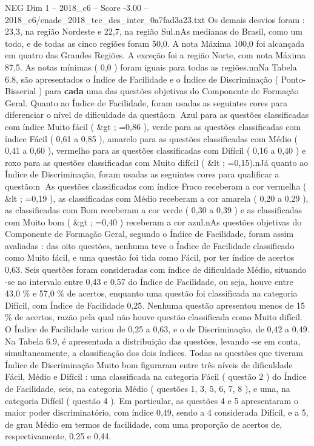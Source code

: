 \begin{textsample}{NEG Dim 1 – 2018\_c6 – Score -3.00 – 2018\_c6/enade\_2018\_tec\_des\_inter\_0a7fad3a23.txt}
Os demais desvios foram : 23,3, na região Nordeste e 22,7, na região Sul.nAs medianas do Brasil, como um todo, e de todas as cinco regiões foram 50,0.
A nota Máxima 100,0 foi alcançada em quatro das Grandes Regiões.
A exceção foi a região Norte, com nota Máxima 87,5.
As notas mínimas ( 0,0 ) foram iguais para todas as regiões.nnNa Tabela 6.8, são apresentados o Índice de Facilidade e o Índice de Discriminação ( Ponto-Bisserial ) para \textbf{cada} uma das questões objetivas do Componente de Formação Geral.
Quanto ao Índice de Facilidade, foram usadas as seguintes cores para diferenciar o nível de dificuldade da questão:n Azul para as questões classificadas com índice Muito fácil ( \&gt ; =0,86 ), verde para as questões classificadas com índice Fácil ( 0,61 a 0,85 ), amarelo para as questões classificadas com Médio ( 0,41 a 0,60 ), vermelho para as questões classificadas com Difícil ( 0,16 a 0,40 ) e roxo para as questões classificadas com Muito difícil ( \&lt ; =0,15).nJá quanto ao Índice de Discriminação, foram usadas as seguintes cores para qualificar a questão:n As questões classificadas com índice Fraco receberam a cor vermelha ( \&lt ; =0,19 ), as classificadas com Médio receberam a cor amarela ( 0,20 a 0,29 ), as classificadas com Bom receberam a cor verde ( 0,30 a 0,39 ) e as classificadas com Muito bom ( \&gt ; =0,40 ) receberam a cor azul.nAs questões objetivas do Componente de Formação Geral, segundo o Índice de Facilidade, foram assim avaliadas : das oito questões, nenhuma teve o Índice de Facilidade classificado como Muito fácil, e uma questão foi tida como Fácil, por ter índice de acertos 0,63.
Seis questões foram consideradas com índice de dificuldade Médio, situando -se no intervalo entre 0,43 e 0,57 do Índice de Facilidade, ou seja, houve entre 43,0 \% e 57,0 \% de acertos, enquanto uma questão foi classificada na categoria Difícil, com Índice de Facilidade 0,25.
Nenhuma questão apresentou menos de 15 \% de acertos, razão pela qual não houve questão classificada como Muito difícil.
O Índice de Facilidade variou de 0,25 a 0,63, e o de Discriminação, de 0,42 a 0,49.
Na Tabela 6.9, é apresentada a distribuição das questões, levando -se em conta, simultaneamente, a classificação dos dois índices.
Todas as questões que tiveram Índice de Discriminação Muito bom figuraram entre três níveis de dificuldade Fácil, Médio e Difícil : uma classificada na categoria Fácil ( questão 2 ) do Índice de Facilidade, seis, na categoria Médio ( questões 1, 3, 5, 6, 7, 8 ), e uma, na categoria Difícil ( questão 4 ).
Em particular, as questões 4 e 5 apresentaram o maior poder discriminatório, com índice 0,49, sendo a 4 considerada Difícil, e a 5, de grau Médio em termos de facilidade, com uma proporção de acertos de, respectivamente, 0,25 e 0,44.

\end{textsample}
